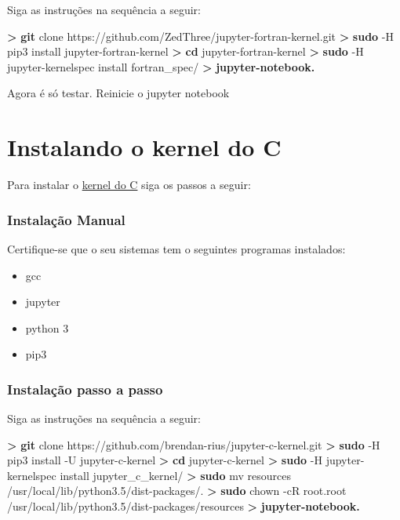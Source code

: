 \documentclass[11pt]{article}
\providecommand{\tightlist}{%
      \setlength{\itemsep}{0pt}\setlength{\parskip}{0pt}}
\newenvironment{Shaded}{}{}
\newcommand{\KeywordTok}[1]{\textcolor[rgb]{0.00,0.44,0.13}{\textbf{{#1}}}}
\newcommand{\NormalTok}[1]{{#1}}
\begin{document}
Siga as instruções na sequência a seguir:

\begin{Shaded}
\begin{Highlighting}[]
\KeywordTok{>} \KeywordTok{git} \NormalTok{clone https://github.com/ZedThree/jupyter-fortran-kernel.git}
\KeywordTok{>} \KeywordTok{sudo} \NormalTok{-H pip3 install jupyter-fortran-kernel}
\KeywordTok{>} \KeywordTok{cd} \NormalTok{jupyter-fortran-kernel}
\KeywordTok{>} \KeywordTok{sudo} \NormalTok{-H jupyter-kernelspec install fortran_spec/}
\KeywordTok{>} \KeywordTok{jupyter-notebook.} 
\end{Highlighting}
\end{Shaded}

Agora é só testar. Reinicie o jupyter notebook

    \section{Instalando o kernel do C}\label{instalando-o-kernel-do-c}

Para instalar o
\href{https://github.com/brendan-rius/jupyter-c-kernel}{kernel do C}
siga os passos a seguir:

\subsubsection{Instalação Manual}\label{instalauxe7uxe3o-manual}

Certifique-se que o seu sistemas tem o seguintes programas instalados:

\begin{itemize}
\tightlist
\item
  gcc
\item
  jupyter
\item
  python 3
\item
  pip3
\end{itemize}

\subsubsection{Instalação passo a
passo}\label{instalauxe7uxe3o-passo-a-passo}

Siga as instruções na sequência a seguir:

\begin{Shaded}
\begin{Highlighting}[]
\KeywordTok{>} \KeywordTok{git} \NormalTok{clone https://github.com/brendan-rius/jupyter-c-kernel.git}
\KeywordTok{>} \KeywordTok{sudo} \NormalTok{-H pip3 install -U jupyter-c-kernel}
\KeywordTok{>} \KeywordTok{cd} \NormalTok{jupyter-c-kernel}
\KeywordTok{>} \KeywordTok{sudo} \NormalTok{-H jupyter-kernelspec install jupyter_c_kernel/}
\KeywordTok{>} \KeywordTok{sudo} \NormalTok{mv resources /usr/local/lib/python3.5/dist-packages/.}
\KeywordTok{>} \KeywordTok{sudo} \NormalTok{chown -cR root.root /usr/local/lib/python3.5/dist-packages/resources}
\KeywordTok{>} \KeywordTok{jupyter-notebook.} 
\end{Highlighting}
\end{Shaded}
\end{document}
